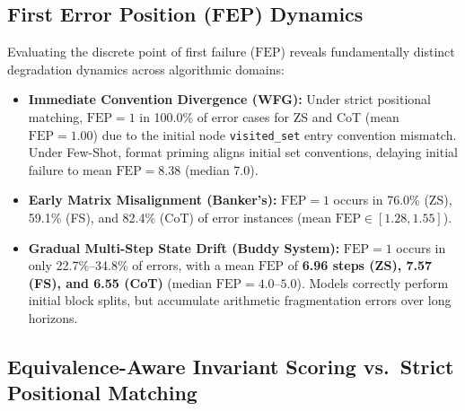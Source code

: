 \documentclass[conference]{IEEEtran}
\newcommand{\FEP}{\text{FEP}}
\begin{document}
\subsection{First Error Position (FEP) Dynamics}

Evaluating the discrete point of first failure ($\FEP$) reveals fundamentally distinct
degradation dynamics across algorithmic domains:
\begin{itemize}
\item \textbf{Immediate Convention Divergence (WFG):} Under strict positional matching,
  $\FEP = 1$ in 100.0\% of error cases for ZS and CoT (mean $\FEP = 1.00$) due to the
  initial node \texttt{visited\_set} entry convention mismatch. Under Few-Shot, format
  priming aligns initial set conventions, delaying initial failure to mean $\FEP = 8.38$
  (median 7.0).
\item \textbf{Early Matrix Misalignment (Banker's):} $\FEP = 1$ occurs in 76.0\% (ZS),
  59.1\% (FS), and 82.4\% (CoT) of error instances (mean $\FEP \in [1.28, 1.55]$).
\item \textbf{Gradual Multi-Step State Drift (Buddy System):} $\FEP = 1$ occurs in only
  22.7\%--34.8\% of errors, with a mean $\FEP$ of \textbf{6.96 steps (ZS), 7.57 (FS),
  and 6.55 (CoT)} (median $\FEP = 4.0$--$5.0$). Models correctly perform initial block
  splits, but accumulate arithmetic fragmentation errors over long horizons.
\end{itemize}

\subsection{Equivalence-Aware Invariant Scoring vs.\ Strict Positional Matching}
\end{document}
